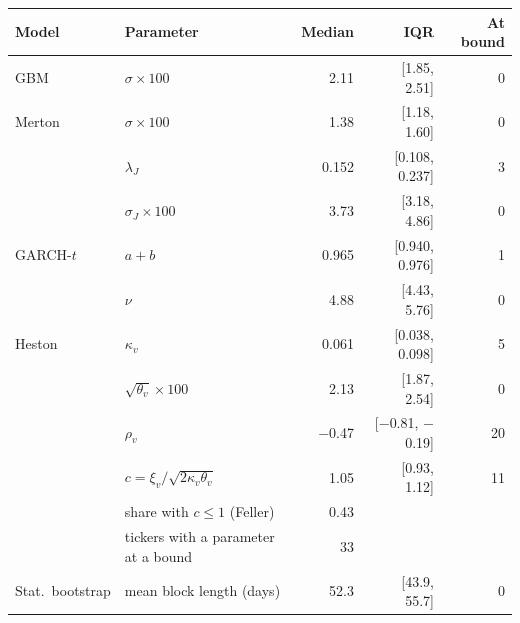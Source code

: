 \begin{tabular}{llrrr}
\toprule
Model & Parameter & Median & IQR & At bound \\
\midrule
GBM & $\sigma\times100$ & 2.11 & [1.85, 2.51] & 0 \\
\addlinespace
Merton & $\sigma\times100$ & 1.38 & [1.18, 1.60] & 0 \\
 & $\lambda_J$ & 0.152 & [0.108, 0.237] & 3 \\
 & $\sigma_J\times100$ & 3.73 & [3.18, 4.86] & 0 \\
\addlinespace
GARCH-$t$ & $a+b$ & 0.965 & [0.940, 0.976] & 1 \\
 & $\nu$ & 4.88 & [4.43, 5.76] & 0 \\
\addlinespace
Heston & $\kappa_v$ & 0.061 & [0.038, 0.098] & 5 \\
 & $\sqrt{\theta_v}\times100$ & 2.13 & [1.87, 2.54] & 0 \\
 & $\rho_v$ & $-$0.47 & [$-$0.81, $-$0.19] & 20 \\
 & $c=\xi_v/\sqrt{2\kappa_v\theta_v}$ & 1.05 & [0.93, 1.12] & 11 \\
 & share with $c\le1$ (Feller) & 0.43 &  &  \\
 & tickers with a parameter at a bound & 33 &  &  \\
\addlinespace
Stat.\ bootstrap & mean block length (days) & 52.3 & [43.9, 55.7] & 0 \\
\bottomrule
\end{tabular}
